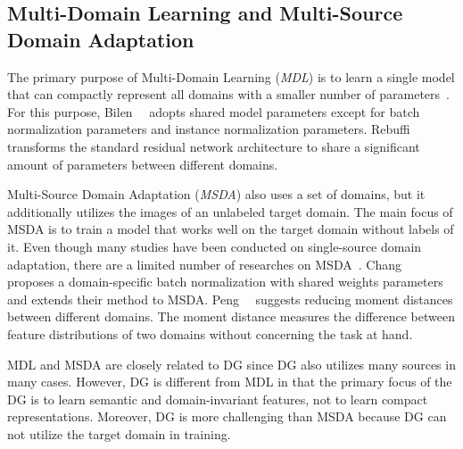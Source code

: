 \subsection{Multi-Domain Learning and Multi-Source Domain Adaptation}
The primary purpose of Multi-Domain Learning (\textit{MDL}) is to learn a single model that can compactly represent all domains with a smaller number of parameters~\cite{yang2015mdlmtl, Rebuffi17, Bilen17, Rebuffi18}. For this purpose, Bilen~\etal~\cite{Bilen17} adopts shared model parameters except for batch normalization parameters and instance normalization parameters. Rebuffi~\etal~\cite{Rebuffi17} transforms the standard residual network architecture to share a significant amount of parameters between different domains.

Multi-Source Domain Adaptation (\textit{MSDA}) also uses a set of domains, but it additionally utilizes the images of an unlabeled target domain. The main focus of MSDA is to train a model that works well on the target domain without labels of it. Even though many studies have been conducted on single-source domain adaptation, there are a limited number of researches on MSDA~\cite{Zhao2018NIPS, Chang2019cvpr, guo2018-multi, peng2018moment}. Chang~\etal~\cite{Chang2019cvpr} proposes a domain-specific batch normalization with shared weights parameters and extends their method to MSDA. Peng~\etal~\cite{peng2018moment} suggests reducing moment distances between different domains. The moment distance measures the difference between feature distributions of two domains without concerning the task at hand.

MDL and MSDA are closely related to DG since DG also utilizes many sources in many cases. However, DG is different from MDL in that the primary focus of the DG is to learn semantic and domain-invariant features, not to learn compact representations. Moreover, DG is more challenging than MSDA because DG can not utilize the target domain in training.


